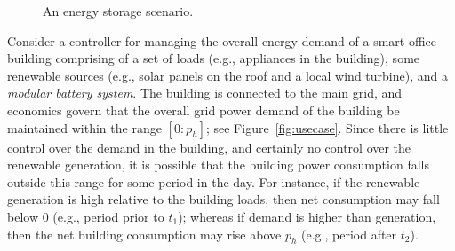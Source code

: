 \newcommand{\pSet}{\mathname{Set*}}
\newcommand{\pSetCharge}{\mathname{SetCharge}}
\newcommand{\pSetDischarge}{\mathname{SetDischarge}}
\newcommand{\pSetNotUsed}{\mathname{SetNotUsed}}
\newcommand{\pExecute}{\mathname{Execute}}

\newcommand{\cSatisfies}{\psi}

\newcommand{\aSet}{\mathname{set}}
\newcommand{\aOperate}{\mathname{operate}}
\newcommand{\aEvaluate}{\mathname{evaluate}}

\begin{figure*}[t]
\begin{center}
\qquad
{}
\caption{An energy storage scenario.}
\end{center}
\label{fig:energystorage}
\end{figure*}

Consider a controller for managing the overall energy demand of a smart office building comprising of a set of loads (e.g., appliances in the building), some renewable sources (e.g., solar panels on the roof and a local wind turbine), and a \emph{modular battery system}. The building is connected to the main grid, and economics govern that the overall grid power demand of the building be maintained within the range $[0:p_h]$; see Figure~\ref{fig:usecase}. 
Since there is little control over the demand in the building, and certainly no control over the renewable generation, it is possible that the building power consumption falls outside this range for some period in the day. For instance, if the renewable generation is high relative to the building loads, then net consumption may fall below $0$ (e.g., period prior to $t_1$); whereas if demand is higher than generation, then the net building consumption may rise above $p_h$ (e.g., period after $t_2$). 


